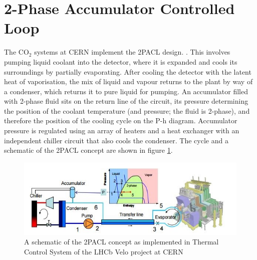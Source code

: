 \documentclass{report}
\begin{document}
\section{2-Phase Accumulator Controlled Loop}
\FloatBarrier
The CO$_2$ systems at CERN implement the 2PACL design. \cite{TIF PoS}\cite{bart}. This involves pumping liquid coolant into the detector, where it is expanded and cools its surroundings by partially evaporating. After cooling the detector with the latent heat of vaporisation, the mix of liquid and vapour returns to the plant by way of a condenser, which returns it to pure liquid for pumping. An accumulator filled with 2-phase fluid sits on the return line of the circuit, its pressure determining the position of the coolant temperature (and pressure; the fluid is 2-phase), and therefore the position of the cooling cycle on the P-h diagram. Accumulator pressure is regulated using an array of heaters and a heat exchanger with an independent chiller circuit that also cools the condenser. The cycle and a schematic of the 2PACL concept are shown in figure \ref{fig:2PACL}.
\begin{figure}[h]
\includegraphics{2PACLschem}
\caption{A schematic of the 2PACL concept as implemented in Thermal Control System of the LHCb Velo project at CERN \cite{CO2 PoS}}
\label{fig:2PACL}
\end{figure}
\FloatBarrier
\end{document}
